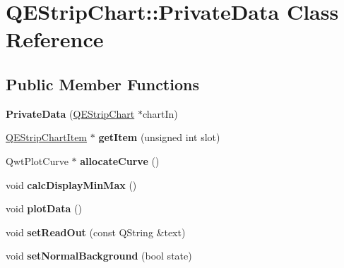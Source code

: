 \hypertarget{classQEStripChart_1_1PrivateData}{
\section{QEStripChart::PrivateData Class Reference}
\label{classQEStripChart_1_1PrivateData}
}
\subsection*{Public Member Functions}
\begin{DoxyCompactItemize}
\item 
\hypertarget{classQEStripChart_1_1PrivateData_a4d230180059f20db3b27701b13f2c548}{
{\bfseries PrivateData} (\hyperlink{classQEStripChart}{QEStripChart} $\ast$chartIn)}
\label{classQEStripChart_1_1PrivateData_a4d230180059f20db3b27701b13f2c548}

\item 
\hypertarget{classQEStripChart_1_1PrivateData_a0d2d4058277e9600d1873ebf550269bf}{
\hyperlink{classQEStripChartItem}{QEStripChartItem} $\ast$ {\bfseries getItem} (unsigned int slot)}
\label{classQEStripChart_1_1PrivateData_a0d2d4058277e9600d1873ebf550269bf}

\item 
\hypertarget{classQEStripChart_1_1PrivateData_a6862b6dbed99d486a0ebc455ce0c2ab7}{
QwtPlotCurve $\ast$ {\bfseries allocateCurve} ()}
\label{classQEStripChart_1_1PrivateData_a6862b6dbed99d486a0ebc455ce0c2ab7}

\item 
\hypertarget{classQEStripChart_1_1PrivateData_a8accd24a6ea7b64180b6d382a0d4a8db}{
void {\bfseries calcDisplayMinMax} ()}
\label{classQEStripChart_1_1PrivateData_a8accd24a6ea7b64180b6d382a0d4a8db}

\item 
\hypertarget{classQEStripChart_1_1PrivateData_a77936394e48fec5eb904556a678a4197}{
void {\bfseries plotData} ()}
\label{classQEStripChart_1_1PrivateData_a77936394e48fec5eb904556a678a4197}

\item 
\hypertarget{classQEStripChart_1_1PrivateData_ac524dcf9b2942647ff2367b1976b7272}{
void {\bfseries setReadOut} (const QString \&text)}
\label{classQEStripChart_1_1PrivateData_ac524dcf9b2942647ff2367b1976b7272}

\item 
\hypertarget{classQEStripChart_1_1PrivateData_a07753eba224e9f93a046ef86a2a0402b}{
void {\bfseries setNormalBackground} (bool state)}
\label{classQEStripChart_1_1PrivateData_a07753eba224e9f93a046ef86a2a0402b}


\end{DoxyCompactItemize}
